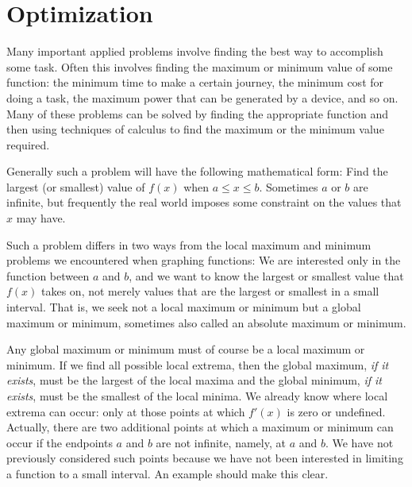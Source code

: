 \section{Optimization}{}{}

Many important applied problems involve finding the best way to
accomplish some task. Often this involves finding the maximum or
minimum value of some function: the minimum time to make a certain
journey, the minimum cost for doing a task, the maximum power that can
be generated by a device, and so on. Many of these problems can be
solved by finding the appropriate function and then using techniques
of calculus to find the maximum or the minimum value required.

Generally such a problem will have the following mathematical form:
Find the largest (or smallest) value of $f(x)$ when $a\le x\le
b$. Sometimes $a$ or $b$ are infinite, but frequently the real world
imposes some constraint on the values that $x$ may have.

Such a problem differs in two ways from the local maximum and minimum
problems we encountered when graphing functions: We are interested
only in the function between $a$ and $b$, and we want to know the
largest or smallest value that $f(x)$ takes on, not merely values that
are the largest or smallest in a small interval. That is, we seek not
a local maximum or minimum but a {\dfont global\/} maximum or minimum, sometimes also called an {\dfont
absolute\/} maximum or minimum.

Any global maximum or minimum must of course be a local maximum or
minimum. If we find all possible local extrema, then the global
maximum, {\em if it exists}, must be the largest of the local maxima
and the global minimum, {\em if it exists}, must be the smallest of
the local minima. We already know where local extrema can occur: only
at those points at which $f'(x)$ is zero or undefined. Actually, there
are two additional points at which a maximum or minimum can occur if
the endpoints $a$ and $b$ are not infinite, namely, at $a$ and $b$. We
have not previously considered such points because we have not been
interested in limiting a function to a small interval. An example
should make this clear.

